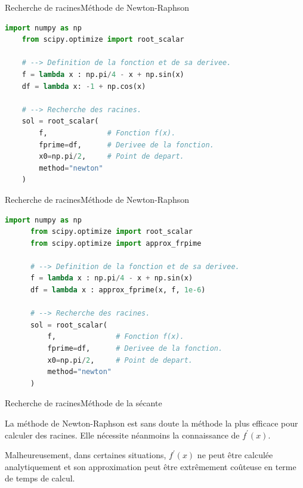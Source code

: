 \documentclass[usenames,dvipsnames,svgnames,10pt,aspectratio=169]{beamer}
\begin{document}
\begin{frame}[t, c, fragile]{Recherche de racines}{Méthode de Newton-Raphson}
  \begin{lstlisting}[language=Python]
    import numpy as np
    from scipy.optimize import root_scalar
    
    # --> Definition de la fonction et de sa derivee.
    f = lambda x : np.pi/4 - x + np.sin(x)
    df = lambda x: -1 + np.cos(x)
    
    # --> Recherche des racines.
    sol = root_scalar(
        f,              # Fonction f(x).
        fprime=df,      # Derivee de la fonction.
        x0=np.pi/2,     # Point de depart.
        method="newton"
    )

  \end{lstlisting}
\end{frame}

\begin{frame}[t, c, fragile]{Recherche de racines}{Méthode de Newton-Raphson}
  \begin{minipage}{.68\textwidth}
    \begin{lstlisting}[language=Python]
      import numpy as np
      from scipy.optimize import root_scalar
      from scipy.optimize import approx_frpime
      
      # --> Definition de la fonction et de sa derivee.
      f = lambda x : np.pi/4 - x + np.sin(x)
      df = lambda x : approx_fprime(x, f, 1e-6)
      
      # --> Recherche des racines.
      sol = root_scalar(
          f,              # Fonction f(x).
          fprime=df,      # Derivee de la fonction.
          x0=np.pi/2,     # Point de depart.
          method="newton"
      )
    \end{lstlisting}
  \end{minipage}%
  \hfill
  \begin{minipage}{.28\textwidth}
  \end{minipage}
\end{frame}

\begin{frame}[t, c]{Recherche de racines}{Méthode de la sécante}
  \begin{minipage}{.68\textwidth}
    La méthode de Newton-Raphson est sans doute la méthode la plus efficace pour calculer des racines.
    Elle nécessite néanmoins la connaissance de $f^{\prime}(x)$.

    \bigskip

    Malheureusement, dans certaines situations, $f^{\prime}(x)$ ne peut être calculée analytiquement et son approximation peut être extrêmement coûteuse en terme de temps de calcul.
  \end{minipage}%
  \hfill
  \begin{minipage}{.28\textwidth}
  \end{minipage}

  \vspace{1cm}
\end{frame}
\end{document}
